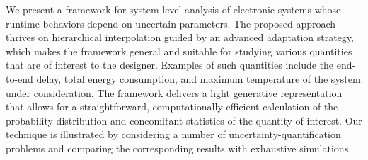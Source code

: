We present a framework for system-level analysis of electronic systems whose
runtime behaviors depend on uncertain parameters. The proposed approach thrives
on hierarchical interpolation guided by an advanced adaptation strategy, which
makes the framework general and suitable for studying various quantities that
are of interest to the designer. Examples of such quantities include the
end-to-end delay, total energy consumption, and maximum temperature of the
system under consideration. The framework delivers a light generative
representation that allows for a straightforward, computationally efficient
calculation of the probability distribution and concomitant statistics of the
quantity of interest. Our technique is illustrated by considering a number of
uncertainty-quantification problems and comparing the corresponding results with
exhaustive simulations.
